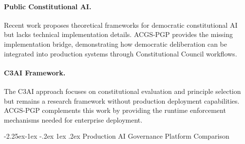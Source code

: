 \documentclass[manuscript,screen,9pt]{acmart}
\makeatletter
\renewcommand\subsection{\@startsection{subsection}{2}{\z@}%
  {-2.25ex\@plus -1ex \@minus -.2ex}%
  {1ex \@plus .2ex}%
  {\normalfont\large\bfseries}}
\makeatother
\begin{document}
\paragraph{Public Constitutional AI.} Recent work \citep{Abiri2024PublicConstitutionalAI} proposes theoretical frameworks for democratic constitutional AI but lacks technical implementation details. ACGS-PGP provides the missing implementation bridge, demonstrating how democratic deliberation can be integrated into production systems through Constitutional Council workflows.

\paragraph{C3AI Framework.} The C3AI approach \citep{C3AI2025Framework} focuses on constitutional evaluation and principle selection but remains a research framework without production deployment capabilities. ACGS-PGP complements this work by providing the runtime enforcement mechanisms needed for enterprise deployment.

\subsection{Production AI Governance Platform Comparison}
\end{document}
